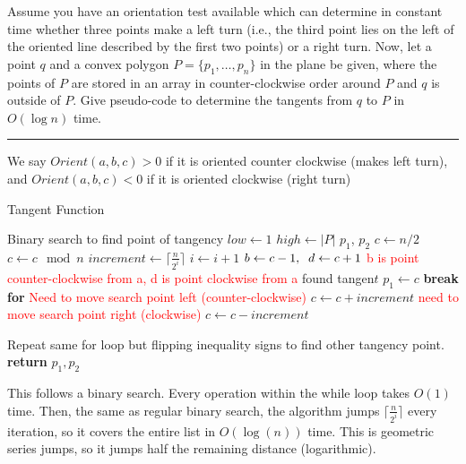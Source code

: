 \documentclass[11pt]{article}
\begin{document}

Assume you have an orientation test available which can determine in constant
time whether three points make a left turn (i.e., the third point lies on the
left of the oriented line described by the first two points) or a right turn.
Now, let a point $q$ and a convex polygon $P = \{ p_1, \ldots , p_n \}$ in the
plane be given, where the points of $P$ are stored in an array in
counter-clockwise order around $P$ and $q$ is outside of $P$. Give pseudo-code
to determine the tangents from $q$ to $P$ in $O(\log n)$ time.

\hrule

We say $Orient(a,b,c) > 0$ if it is oriented counter clockwise (makes left turn), and $Orient(a,b,c) < 0$ if it is oriented clockwise (right turn)

\begin{algorithm}
    \caption{Tangent Function}
    \label{alg:prob1}
    \begin{algorithmic}[1]
        \State Binary search to find point of tangency
        \State $low \gets 1$
        \State $high \gets |P|$
        \State $p_1$, $p_2$
        \State $c \gets n/2$
            \State $c \gets c \mod n$
            \State $increment \gets \lceil \frac{n}{2^i} \rceil$
            \State $i \gets i + 1$
            \State $b \gets c-1, \sp d \gets c + 1$ \quad \textcolor{red}{b is point counter-clockwise from a, d is point clockwise from a}
                \State found tangen$t$
                \State $p_1 \gets c$
                \State \textbf{break for}
                \State \textcolor{red}{Need to move search point left (counter-clockwise)}
                \State $c \gets c + increment$
                \State \textcolor{red}{need to move search point right (clockwise)}
                \State $c \gets c - increment$
            \EndIf
        \EndFor

        \State Repeat same for loop but flipping inequality signs to find other tangency point.
        \State \textbf{return} $p_1, p_2$
    \EndFunction
    \end{algorithmic}
\end{algorithm}


This follows a binary search. Every operation within the while loop takes $O(1)$ time. Then, the same as regular binary search,
the algorithm jumps $\lceil \frac{n}{2^i} \rceil$ every iteration, so it covers the entire list in $O(\log (n))$ time.
This is geometric series jumps, so it jumps half the remaining distance (logarithmic).
\end{document}
